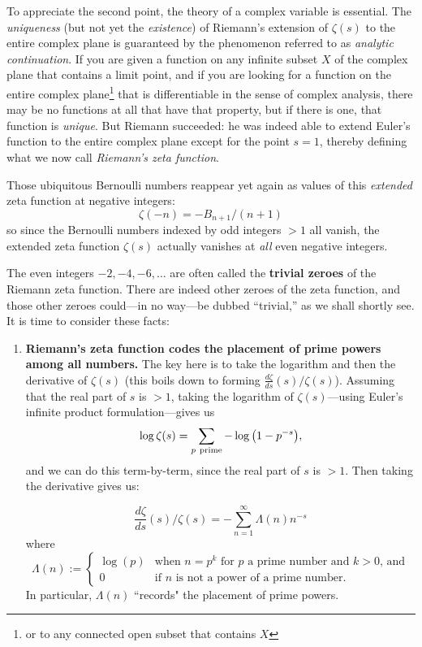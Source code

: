 \documentclass[openany]{book}
\theoremstyle{plain}
\theoremstyle{definition}
\begin{document}
{{To appreciate the second point, the theory of a complex variable is
essential. The {\it uniqueness} (but not yet the {\it existence}) of
Riemann's extension of $\zeta(s)$ to the entire complex plane is
guaranteed by the phenomenon referred to as {\it analytic
  continuation}.  If you are given a function on any infinite subset
$X$ of the complex plane that contains a limit point, and if you are
looking for a function on the entire complex plane{\footnote{ or to
    any connected open subset that contains $X$}} that is
differentiable in the sense of complex analysis, there may be no
functions at all that have that property, but if there is one, that
function is {\it unique}.  But Riemann succeeded: he was indeed able
to extend Euler's function to the entire complex plane except for the
point $s=1$, thereby defining what we now call {\it Riemann's zeta
  function}.  \vskip20pt

Those ubiquitous Bernoulli numbers reappear yet again as
values of this {\it extended} zeta function at negative integers:
$$\zeta(-n) = -B_{n+1}/(n+1)$$
so since the Bernoulli numbers indexed by odd integers $>1$ all
vanish, the extended zeta function $\zeta(s)$ actually vanishes at
{\it all} even negative integers.

The even integers $-2, -4, -6, \dots$ are often called the {\bf
trivial zeroes} of the Riemann zeta function.  There are indeed
other zeroes of the zeta function, and those other zeroes could---in no way---be
dubbed ``trivial,'' as we shall shortly see.
\vskip20pt
It is time to consider these facts:

  \begin{enumerate}\item {\bf Riemann's zeta function codes the
      placement of prime powers among all numbers.} The key here is to
    take the logarithm and then the derivative of $\zeta(s)$ (this boils
    down to forming ${\frac{d{\zeta}}{ds}}(s)/\zeta(s)$). Assuming
    that the real part of $s$ is $>1$, taking the logarithm of
    $\zeta(s)$---using Euler's infinite product formulation---gives
    us $$\log\zeta(s)= \sum_{p \ {\rm
        prime}}-\log{\big(1-p^{-s}\big)},$$ and we can do this
    term-by-term, since the real part of $s$ is $>1$.  Then taking the
    derivative gives us:

  \vskip20pt
$${\frac{d{\zeta}}{ds}}(s)/\zeta(s)= -\sum_{n=1}^{\infty}\Lambda(n)n^{-s}$$
where
$$
    \Lambda(n) :=
    \begin{cases}
     \log(p) & \text{when $n= p^k$ for $p$ a prime number and $k >0$, and}\\
       0     & \text{if $n$ is not a power of a prime number.}
    \end{cases}
$$
In particular,  $\Lambda(n)$ ``records" the placement of prime powers.


\end{enumerate}}}
\end{document}
